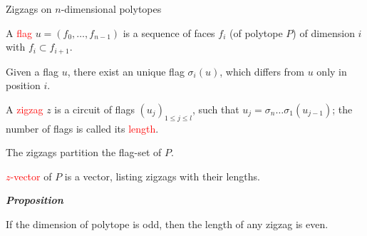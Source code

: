 \documentclass[%
pdf,
colorBG,
slideColor,
]{prosper}
\begin{document}
\begin{slide}{Zigzags on $n$-dimensional polytopes}

A \textcolor{red}{flag} $u=(f_0, \dots, f_{n-1})$ is a sequence of faces $f_i$ (of polytope $P$) of dimension $i$ with $f_i\subset f_{i+1}$.

Given a flag $u$, there exist an unique flag $\sigma_i(u)$, which differs from $u$ only in position $i$.

\vspace{3mm}

A \textcolor{red}{zigzag} $z$ is a circuit of flags $(u_j)_{1\leq j\leq l}$, such that $u_j=\sigma_n\dots\sigma_1(u_{j-1})$; the number of flags is called its \textcolor{red}{length}.

\vspace{3mm}

The zigzags partition the flag-set of $P$.

\textcolor{red}{$z$-vector} of $P$ is a vector, listing zigzags with their lengths.

\vspace{3mm}


{\em {\bf Proposition}

If the dimension of polytope is odd, then the length of any zigzag is even.
}

\end{slide}
\end{document}
